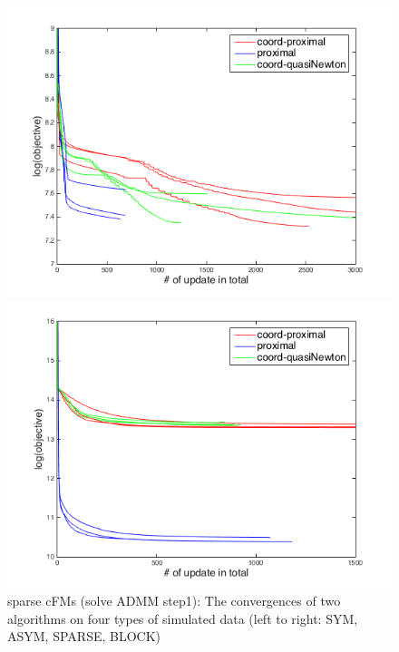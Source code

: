 \documentclass{article}
\begin{document}
\begin{figure}[htbp]
\begin{minipage}{0.24\textwidth}
  \end{minipage}
  \hfill
  \begin{minipage}{0.24\textwidth}
    \centering
    \includegraphics[width=1\textwidth]{../yanyu_code/plots/sparse_w0wW_curve_p30}
  \end{minipage}
  \hfill
  \begin{minipage}{0.24\textwidth}
    \centering
    \includegraphics[width=1\textwidth]{../yanyu_code/plots/block_w0wW_curve_p30}
  \end{minipage}
  \caption{sparse cFMs (solve ADMM step1): The convergences of two algorithms on four types of simulated data (left to right: SYM, ASYM, SPARSE, BLOCK)}
  \label{fig:argminw0wW_curve}
\end{figure}
\end{document}
